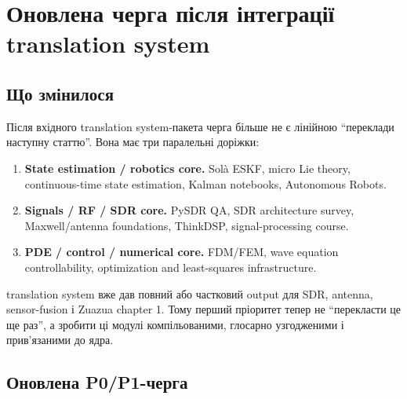 \chapter{Оновлена черга після інтеграції translation system}
\label{ch:session04-queue}

\section{Що змінилося}

Після вхідного translation system-пакета черга більше не є лінійною ``переклади наступну статтю''. Вона має три паралельні доріжки:

\begin{enumerate}[label=\arabic*.]
\item \textbf{State estimation / robotics core.} Solà ESKF, micro Lie theory, continuous-time state estimation, Kalman notebooks, Autonomous Robots.
\item \textbf{Signals / RF / SDR core.} PySDR QA, SDR architecture survey, Maxwell/antenna foundations, ThinkDSP, signal-processing course.
\item \textbf{PDE / control / numerical core.} FDM/FEM, wave equation controllability, optimization and least-squares infrastructure.
\end{enumerate}

translation system вже дав повний або частковий output для SDR, antenna, sensor-fusion і Zuazua chapter 1. Тому перший пріоритет тепер не ``перекласти це ще раз'', а зробити ці модулі компільованими, глосарно узгодженими і прив'язаними до ядра.

\section{Оновлена P0/P1-черга}

